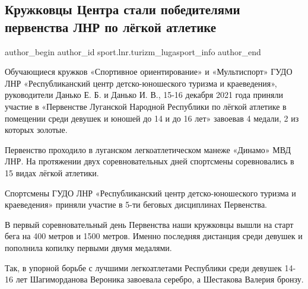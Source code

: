  
 
 
 
 
\subsection{Кружковцы Центра стали победителями первенства ЛНР по лёгкой атлетике}
\label{sec:16_12_2021.stz.sport.lnr.turizm_lugasport_info.1.pervenstvo_lnr_legkaja_atletika}

\ifcmt
 author_begin
   author_id sport.lnr.turizm_lugasport_info
 author_end
\fi

Обучающиеся кружков «Спортивное ориентирование» и «Мультиспорт» ГУДО ЛНР
«Республиканский центр детско-юношеского туризма и краеведения», руководители
Данько Е. Б. и Данько И. В., 15-16 декабря 2021 года приняли участие в
«Первенстве Луганской Народной Республики по лёгкой атлетике в помещении среди
девушек и юношей до 14 и до 16 лет» завоевав 4 медали, 2 из которых золотые.

Первенство проходило в луганском легкоатлетическом манеже «Динамо» МВД ЛНР. На
протяжении двух соревновательных дней спортсмены соревновались  в 15 видах
лёгкой атлетики.

Спортсмены ГУДО ЛНР «Республиканский центр детско-юношеского туризма и
краеведения» приняли участие в 5-ти беговых дисциплинах Первенства.

В первый соревновательный день Первенства наши кружковцы вышли на старт бега на
400 метров и 1500 метров. Именно последняя дистанция среди девушек и пополнила
копилку первыми двумя медалями.

Так, в упорной борьбе с лучшими легкоатлетами Республики среди девушек 14-16
лет Шагиморданова Вероника завоевала серебро, а Шестакова Валерия бронзу.


